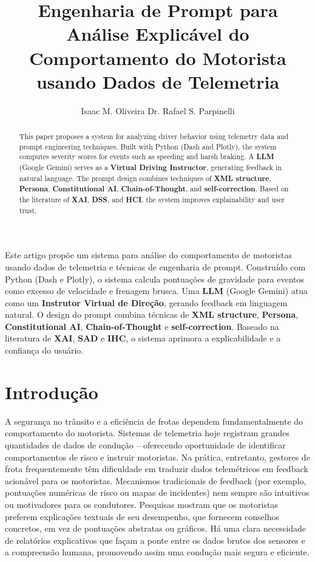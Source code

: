 \documentclass[12pt]{article}
\title{Engenharia de Prompt para Análise Explicável do Comportamento do Motorista usando Dados de Telemetria}
\author{Isaac M. Oliveira\inst{1} Dr. Rafael S. Parpinelli\inst{1} }
\begin{document}
\maketitle

\begin{abstract}
This paper proposes a system for analyzing driver behavior using telemetry data and prompt engineering techniques. Built with Python (Dash and Plotly), the system computes severity scores for events such as speeding and harsh braking. A \textbf{LLM} (Google Gemini) serves as a \textbf{Virtual Driving Instructor}, generating feedback in natural language. The prompt design combines techniques of \textbf{XML structure}, \textbf{Persona}, \textbf{Constitutional AI}, \textbf{Chain-of-Thought}, and \textbf{self-correction}. Based on the literature of \textbf{XAI}, \textbf{DSS}, and \textbf{HCI}, the system improves explainability and user trust.
\end{abstract}

\begin{resumo}
Este artigo propõe um sistema para análise do comportamento de motoristas usando dados de telemetria e técnicas de engenharia de prompt. Construído com Python (Dash e Plotly), o sistema calcula pontuações de gravidade para eventos como excesso de velocidade e frenagem brusca. Uma \textbf{LLM} (Google Gemini) atua como um \textbf{Instrutor Virtual de Direção}, gerando feedback em linguagem natural. O design do prompt combina técnicas de \textbf{XML structure}, \textbf{Persona}, \textbf{Constitutional AI}, \textbf{Chain-of-Thought} e \textbf{self-correction}. Baseado na literatura de \textbf{XAI}, \textbf{SAD} e \textbf{IHC}, o sistema aprimora a explicabilidade e a confiança do usuário. 
\end{resumo}

\section{Introdução}


A segurança no trânsito e a eficiência de frotas dependem fundamentalmente do comportamento do motorista. Sistemas de telemetria hoje registram grandes quantidades de dados de condução – oferecendo oportunidade de identificar comportamentos de risco e instruir motoristas. Na prática, entretanto, gestores de frota frequentemente têm dificuldade em traduzir dados telemétricos em feedback acionável para os motoristas. Mecanismos tradicionais de feedback (por exemplo, pontuações numéricas de risco ou mapas de incidentes) nem sempre são intuitivos ou motivadores para os condutores. Pesquisas mostram que os motoristas preferem explicações textuais de seu desempenho, que fornecem conselhos concretos, em vez de pontuações abstratas ou gráficos. Há uma clara necessidade de relatórios explicativos que façam a ponte entre os dados brutos dos sensores e a compreensão humana, promovendo assim uma condução mais segura e eficiente.
\end{document}
